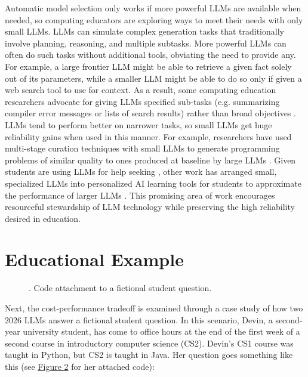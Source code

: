 Automatic model selection only works if more powerful LLMs are available when needed, so computing educators are exploring ways to meet their needs with only small LLMs. LLMs can simulate complex generation tasks that traditionally involve planning, reasoning, and multiple subtasks. More powerful LLMs can often do such tasks without additional tools, obviating the need to provide any. For example, a large frontier LLM might be able to retrieve a given fact solely out of its parameters, while a smaller LLM might be able to do so only if given a web search tool to use for context. As a result, some computing education researchers advocate for giving LLMs specified sub-tasks (e.g. summarizing compiler error messages or lists of search results) rather than broad objectives \cite{falknerEffectiveUseLarge2026}. LLMs tend to perform better on narrower tasks, so small LLMs get huge reliability gains when used in this manner. For example, researchers have used multi-stage curation techniques with small LLMs to generate programming problems of similar quality to ones produced at baseline by large LLMs \cite{jimenezrodriguezPersonalizedCodingProblem2026}. Given students are using LLMs for help seeking \cite{houEffectsGenerativeAI2024}, other work has arranged small, specialized LLMs into personalized AI learning tools for students to approximate the performance of larger LLMs \cite{tanejaAgenticRAGPersonalized2025}. This promising area of work encourages resourceful stewardship of LLM technology while preserving the high reliability desired in education.

\section{Educational Example}\label{educational-example}

\begin{figure}
\centering

\caption{. Code attachment to a fictional student question.}
\end{figure}

Next, the cost-performance tradeoff is examined through a case study of how two 2026 LLMs answer a fictional student question. In this scenario, Devin, a second-year university student, has come to office hours at the end of the first week of a second course in introductory computer science (CS2). Devin's CS1 course was taught in Python, but CS2 is taught in Java. Her question goes something like this (see \hyperref[_Ref236394173]{Figure 2} for her attached code):

